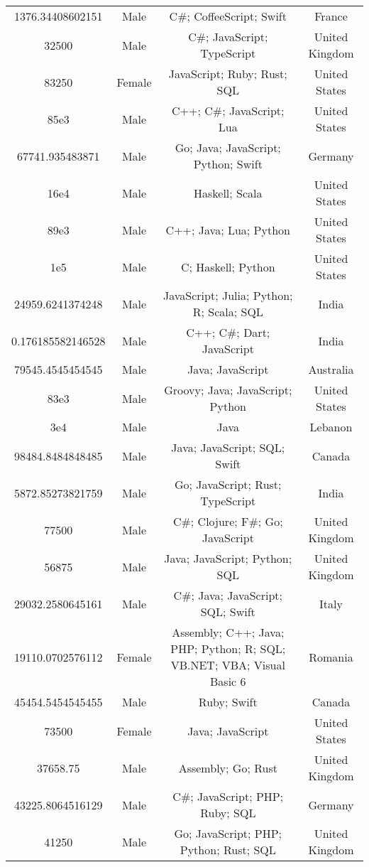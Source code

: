 \begin{center}
\begin{tabular}{ |c|c|c|c| }
1376.34408602151  &  Male  &  C\#; CoffeeScript; Swift  &  France  \\ 
32500  &  Male  &  C\#; JavaScript; TypeScript  &  United Kingdom  \\ 
83250  &  Female  &  JavaScript; Ruby; Rust; SQL  &  United States  \\ 
85e3  &  Male  &  C++; C\#; JavaScript; Lua  &  United States  \\ 
67741.935483871  &  Male  &  Go; Java; JavaScript; Python; Swift  &  Germany  \\ 
16e4  &  Male  &  Haskell; Scala  &  United States  \\ 
89e3  &  Male  &  C++; Java; Lua; Python  &  United States  \\ 
1e5  &  Male  &  C; Haskell; Python  &  United States  \\ 
24959.6241374248  &  Male  &  JavaScript; Julia; Python; R; Scala; SQL  &  India  \\ 
0.176185582146528  &  Male  &  C++; C\#; Dart; JavaScript  &  India  \\ 
79545.4545454545  &  Male  &  Java; JavaScript  &  Australia  \\ 
83e3  &  Male  &  Groovy; Java; JavaScript; Python  &  United States  \\ 
3e4  &  Male  &  Java  &  Lebanon  \\ 
98484.8484848485  &  Male  &  Java; JavaScript; SQL; Swift  &  Canada  \\ 
5872.85273821759  &  Male  &  Go; JavaScript; Rust; TypeScript  &  India  \\ 
77500  &  Male  &  C\#; Clojure; F\#; Go; JavaScript  &  United Kingdom  \\ 
56875  &  Male  &  Java; JavaScript; Python; SQL  &  United Kingdom  \\ 
29032.2580645161  &  Male  &  C\#; Java; JavaScript; SQL; Swift  &  Italy  \\ 
19110.0702576112  &  Female  &  Assembly; C++; Java; PHP; Python; R; SQL; VB.NET; VBA; Visual Basic 6  &  Romania  \\ 
45454.5454545455  &  Male  &  Ruby; Swift  &  Canada  \\ 
73500  &  Female  &  Java; JavaScript  &  United States  \\ 
37658.75  &  Male  &  Assembly; Go; Rust  &  United Kingdom  \\ 
43225.8064516129  &  Male  &  C\#; JavaScript; PHP; Ruby; SQL  &  Germany  \\ 
41250  &  Male  &  Go; JavaScript; PHP; Python; Rust; SQL  &  United Kingdom  \\ 

\end{tabular}
\end{center}
